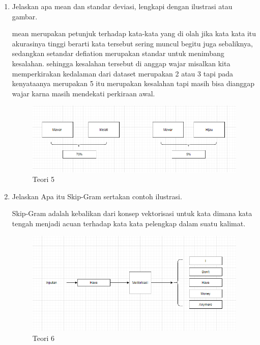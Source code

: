 \begin{enumerate}
\item Jelaskan apa mean dan standar deviasi, lengkapi dengan ilustrasi atau gambar. \par
mean merupakan petunjuk terhadap kata-kata yang di olah jika kata kata itu akurasinya tinggi berarti kata tersebut sering muncul begitu juga sebaliknya, sedangkan setandar defiation merupakan standar untuk menimbang kesalahan. sehingga kesalahan tersebut di anggap wajar misalkan kita memperkirakan kedalaman dari dataset merupakan 2 atau 3 tapi pada kenyataanya merupakan 5 itu merupakan kesalahan tapi masih bisa dianggap wajar karna masih mendekati perkiraan awal.

\begin{figure}[ht]
\centering
\includegraphics[scale=0.3]{figures/1174002/chapter5/5.PNG}
\caption{Teori 5}
\label{contoh}
\end{figure}

\item Jelaskan Apa itu Skip-Gram sertakan contoh ilustrasi. \par
Skip-Gram adalah kebalikan dari konsep vektorisasi untuk kata dimana kata tengah menjadi acuan terhadap kata kata pelengkap dalam suatu kalimat.

\begin{figure}[ht]
\centering
\includegraphics[scale=0.3]{figures/1174002/chapter5/6.PNG}
\caption{Teori 6}
\label{contoh}
\end{figure}

\end{enumerate}

